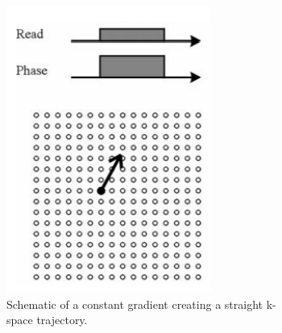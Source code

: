 \begin{figure}[h] %
	\centering
	\graphicspath{{images/}{\main/images/}}
	\begin{subfigure}{0.445\textwidth}
    		\includegraphics[width=\textwidth]{constant_k-space_gradient.png}
    		\caption{Schematic of a constant gradient creating a straight k-space trajectory.}
    		\label{fig:constant_k-space_gradient}
	\end{subfigure}
	\hfill
	\begin{subfigure}{0.445\textwidth}

\end{subfigure}
\end{figure}
